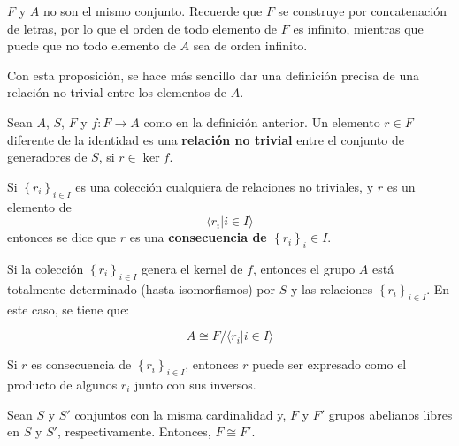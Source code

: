 \documentclass[12pt]{report}
\theoremstyle{largebreak}
\newcommand\cf[3]{\ensuremath{#1:#2\rightarrow#3}}
\begin{document}
    \begin{obs}
        $F$ y $A$ no son el mismo conjunto. Recuerde que $F$ se construye por concatenación de letras, por lo que el orden de todo elemento de $F$ es infinito, mientras que puede que no todo elemento de $A$ sea de orden infinito.
    \end{obs}

    Con esta proposición, se hace más sencillo dar una definición precisa de una relación no trivial entre los elementos de $A$.

    \begin{mydef}
        Sean $A$, $S$, $F$ y $\cf{f}{F}{A}$ como en la definición anterior. Un elemento $r\in F$ diferente de la identidad es una \textbf{relación no trivial} entre el conjunto de generadores de $S$, si $r\in\ker f$.

        Si $\left\{r_i \right\}_{ i\in I}$ es una colección cualquiera de relaciones no triviales, y $r$ es un elemento de
        \begin{equation*}
            \langle r_i\Big|i\in I \rangle
        \end{equation*}
        entonces se dice que $r$ es una \textbf{consecuencia de $\left\{r_i \right\}_i\in I$}.
    \end{mydef}

    Si la colección $\left\{r_i \right\}_{ i\in I}$ genera el kernel de $f$, entonces el grupo $A$ está totalmente determinado (hasta isomorfismos) por $S$ y las relaciones $\left\{ r_i \right\}_{ i\in I}$. En este caso, se tiene que:
    
    \begin{equation*}
        A\cong F/\langle r_i\Big|i\in I \rangle
    \end{equation*}

    \begin{obs}
        Si $r$ es consecuencia de $\left\{r_i \right\}_{ i\in I}$, entonces $r$ puede ser expresado como el producto de algunos $r_i$ junto con sus inversos.
    \end{obs}

    \begin{propo}
        Sean $S$ y $S'$ conjuntos con la misma cardinalidad y, $F$ y $F'$ grupos abelianos libres en $S$ y $S'$, respectivamente. Entonces, $F\cong F'$.
    \end{propo}
\end{document}
